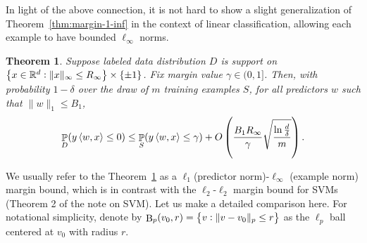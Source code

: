 \documentclass{article}
\newtheorem{theorem}{Theorem}
\DeclareMathOperator*{\B}{{\rm B}}
\DeclareMathOperator{\PP}{{\mathbb P}}
\newcommand{\RR}{\mathbb{R}} %
\newcommand{\inner}[2]{\left\langle #1,#2 \right\rangle}
\begin{document}
In light of the above connection, it is not hard to show a slight generalization of Theorem~\ref{thm:margin-1-inf} in the context of linear classification, allowing each example to have bounded $\ell_\infty$ norms.
\begin{theorem}
Suppose labeled data distribution $D$ is support on $\cbr{x \in \RR^d: \| x \|_\infty \leq R_\infty} \times \cbr{\pm 1}$.
Fix margin value $\gamma \in (0,1]$. Then, with probability $1-\delta$ over the draw of $m$ training examples $S$, for all predictors $w$ such that $\| w \|_1 \leq B_1$,
\[ \PP_D(y \inner{w}{x} \leq 0) \leq \PP_S(y \inner{w}{x} \leq \gamma) + O\del{\frac{B_1 R_\infty}{\gamma}\sqrt{\frac{\ln\frac{d}{\delta}}{m}}}. \]
\label{thm:margin-1-inf-2}
\end{theorem}


We usually refer to the Theorem~\ref{thm:margin-1-inf-2} as a $\ell_1$(predictor norm)-$\ell_\infty$ (example norm) margin bound, which is in contrast with the $\ell_2$-$\ell_2$ margin bound for SVMs (Theorem 2 of the note on SVM). Let us make a detailed comparison here. For notational simplicity, denote by $\B_p(v_0,r) = \cbr{v: \| v - v_0\|_p \leq r}$ as the $\ell_p$ ball centered at $v_0$ with radius $r$.
\end{document}

